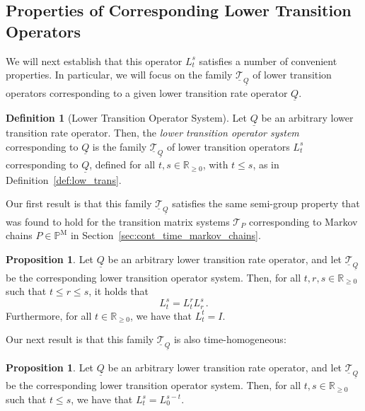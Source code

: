 \documentclass[10pt,a4paper]{paper}
\theoremstyle{definition}
\newtheorem{proposition}[theorem]{Proposition}
\newtheorem{definition}{Definition}
\newcommand{\reals}{\mathbb{R}}
\newcommand{\realsnonneg}{\reals_{\geq 0}}
\newcommand{\processes}{\mathbb{P}}
\newcommand{\mprocesses}{\processes^{\mathrm{M}}}
\newcommand{\lrate}{\underline{Q}}
\begin{document}
\subsection{Properties of Corresponding Lower Transition Operators}\label{sec:properties_lower_trans}

We will next establish that this operator $L_t^s$ satisfies a number of convenient properties. In particular, we will focus on the family $\underline{\mathcal{T}}_{\lrate}$ of lower transition operators corresponding to a given lower transition rate operator $\lrate$.

\begin{definition}[Lower Transition Operator System]
Let $\lrate$ be an arbitrary lower transition rate operator. Then, the \emph{lower transition operator system} corresponding to $\lrate$ is the family $\underline{\mathcal{T}}_{\lrate}$ of lower transition operators $L_t^s$ corresponding to $\lrate$, defined for all $t,s\in\realsnonneg$, with $t\leq s$, as in Definition~\ref{def:low_trans}.
\end{definition}

Our first result is that this family $\underline{\mathcal{T}}_{\lrate}$ satisfies the same semi-group property that was found to hold for the transition matrix systems $\mathcal{T}_P$ corresponding to Markov chains $P\in\mprocesses$ in Section~\ref{sec:cont_time_markov_chains}.

\begin{proposition}\label{prop:lower_trans_system_is_system}
Let $\lrate$ be an arbitrary lower transition rate operator, and let $\underline{\mathcal{T}}_{\lrate}$ be the corresponding lower transition operator system. Then, for all $t,r,s\in\realsnonneg$ such that $t\leq r\leq s$, it holds that
\begin{equation*}
L_t^s = L_t^rL_r^s\,.
\end{equation*}
Furthermore, for all $t\in\realsnonneg$, we have that $L_t^t=I$.
\end{proposition}

Our next result is that this family $\underline{\mathcal{T}}_{\lrate}$ is also time-homogeneous:

\begin{proposition}\label{prop:lower_transition_is_homogeneous}
Let $\lrate$ be an arbitrary lower transition rate operator, and let $\underline{\mathcal{T}}_{\lrate}$ be the corresponding lower transition operator system. Then, for all $t,s\in\realsnonneg$ such that $t\leq s$, we have that $L_t^s=L_0^{s-t}$.
\end{proposition}
\end{document}
